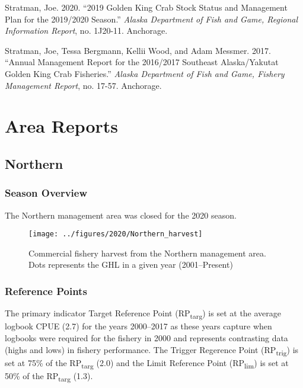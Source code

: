 \documentclass[]{article}
\begin{document}
\hypertarget{ref-stratman2020}{}
Stratman, Joe. 2020. ``2019 Golden King Crab Stock Status and Management
Plan for the 2019/2020 Season.'' \emph{Alaska Department of Fish and
Game, Regional Information Report}, no. 1J20-11. Anchorage.

\hypertarget{ref-stratman2017}{}
Stratman, Joe, Tessa Bergmann, Kellii Wood, and Adam Messmer. 2017.
``Annual Management Report for the 2016/2017 Southeast Alaska/Yakutat
Golden King Crab Fisheries.'' \emph{Alaska Department of Fish and Game,
Fishery Management Report}, no. 17-57. Anchorage.

\section{Area Reports}\label{area-reports}

\subsection{Northern}\label{northern}

\subsubsection{Season Overview}\label{season-overview}

The Northern management area was closed for the 2020 season.

\begin{figure}[H]
\texttt{[image: ../figures/2020/Northern\_harvest]} \caption{Commercial fishery harvest from the Northern management area. Dots represents the GHL in a given year (2001–Present)}\label{fig:unnamed-chunk-2}
\end{figure}

\subsubsection{Reference Points}\label{reference-points-1}

The primary indicator Target Reference Point (RP\textsubscript{targ}) is
set at the average logbook CPUE (2.7) for the years 2000--2017 as these
years capture when logbooks were required for the fishery in 2000 and
represents contrasting data (highs and lows) in fishery performance. The
Trigger Regerence Point (RP\textsubscript{trig}) is set at 75\% of the
RP\textsubscript{targ} (2.0) and the Limit Reference Point
(RP\textsubscript{lim}) is set at 50\% of the RP\textsubscript{targ}
(1.3).
\end{document}
